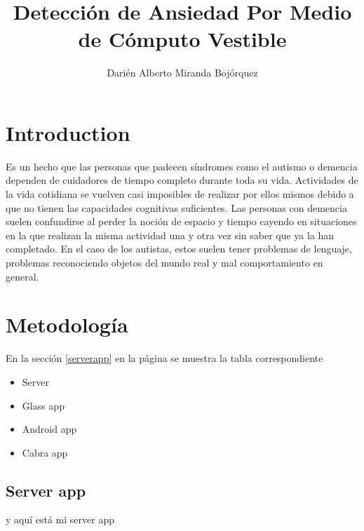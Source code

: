 \documentclass[letterpaper,12pt]{cicese}
\begin{document}
	\doublespace
	\title{Detecci\'on de Ansiedad Por Medio de C\'omputo Vestible}
	\author{Dari\'en Alberto Miranda Boj\'orquez}
	\maketitle
	\newpage
	\tableofcontents
	\newpage
		\chapter{Introduction}
		Es un hecho que las personas que padecen síndromes como el autismo o demencia dependen de cuidadores de tiempo completo durante toda su vida. Actividades de la vida cotidiana se vuelven casi imposibles de realizar por ellos mismos debido a que no tienen las capacidades cognitivas suficientes. Las personas con demencia suelen confundirse al perder la noción de espacio y tiempo cayendo en situaciones en la que realizan la misma actividad una y otra vez sin saber que ya la han completado. En el caso de los autistas, estos suelen tener problemas de lenguaje, problemas reconociendo objetos del mundo real y mal comportamiento en general. 
		\chapter{Metodolog\'ia}
			En la secci\'on \ref{serverapp} en la p\'agina \pageref{serverapp} se muestra la tabla correspondiente
			\begin{itemize}
			\item Server
			\item Glass app
			\item Android app
			\item Cabra app
			\end{itemize}
		\section{Server app}
			y aqu\'i est\'a mi server app\label{serverapp}
	
\end{document}
